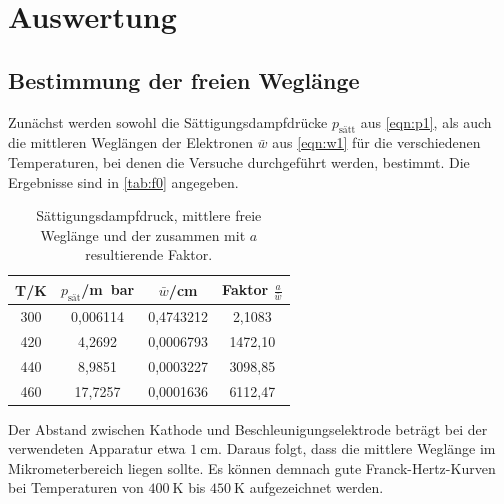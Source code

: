 \section{Auswertung}
\label{sec:Auswertung}

\subsection{Bestimmung der freien Weglänge}
Zunächst werden sowohl die Sättigungsdampfdrücke $p_{\text{sätt}}$ aus \autoref{eqn:p1}, als auch die mittleren Weglängen der Elektronen $\bar{w}$ aus \autoref{eqn:w1}
für die verschiedenen Temperaturen, bei denen die Versuche durchgeführt werden, bestimmt.
Die Ergebnisse sind in \autoref{tab:f0} angegeben.



  \begin{table}[H]
    \centering
    \caption{Sättigungsdampfdruck, mittlere freie Weglänge und der zusammen mit $a$ resultierende Faktor.}
    \label{tab:f0}
    \begin{tabular}{cccc}
        \toprule
        T/\si{\kelvin} & $p_{\text{sät}}$/\si{\m\bar} & $\bar{w}$/\si{\cm} & Faktor $\frac{a}{\bar{w}}$\\
        \midrule
        300 & 0,006114 & 0,4743212 & 2,1083\\ %
        420 & 4,2692 & 0,0006793 & 1472,10\\
        440 & 8,9851 & 0,0003227 & 3098,85\\
        460 & 17,7257 & 0,0001636 & 6112,47\\
        \bottomrule
    \end{tabular}
\end{table}

\noindent
Der Abstand zwischen Kathode und Beschleunigungselektrode beträgt bei der verwendeten Apparatur etwa $\SI{1}{\centi\metre}$.
Daraus folgt, dass die mittlere Weglänge im Mikrometerbereich liegen sollte.
Es können demnach gute Franck-Hertz-Kurven bei Temperaturen von $\SI{400}{\kelvin}$ bis $\SI{450}{\kelvin}$ aufgezeichnet werden.


